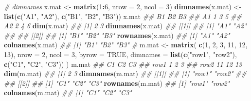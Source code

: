 \documentclass[
]{book}
\newenvironment{Shaded}{\begin{snugshade}}{\end{snugshade}}
\newcommand{\CommentTok}[1]{\textcolor[rgb]{0.56,0.35,0.01}{\textit{#1}}}
\newcommand{\DataTypeTok}[1]{\textcolor[rgb]{0.13,0.29,0.53}{#1}}
\newcommand{\DecValTok}[1]{\textcolor[rgb]{0.00,0.00,0.81}{#1}}
\newcommand{\KeywordTok}[1]{\textcolor[rgb]{0.13,0.29,0.53}{\textbf{#1}}}
\newcommand{\NormalTok}[1]{#1}
\newcommand{\OperatorTok}[1]{\textcolor[rgb]{0.81,0.36,0.00}{\textbf{#1}}}
\newcommand{\OtherTok}[1]{\textcolor[rgb]{0.56,0.35,0.01}{#1}}
\newcommand{\StringTok}[1]{\textcolor[rgb]{0.31,0.60,0.02}{#1}}
\begin{document}
\begin{Shaded}
\begin{Highlighting}[]
\CommentTok{\# dimnames}
\NormalTok{x.mat  \textless{}{-}}\StringTok{  }\KeywordTok{matrix}\NormalTok{(}\DecValTok{1}\OperatorTok{:}\DecValTok{6}\NormalTok{, }\DataTypeTok{nrow =} \DecValTok{2}\NormalTok{, }\DataTypeTok{ncol =} \DecValTok{3}\NormalTok{)}
\KeywordTok{dimnames}\NormalTok{(x.mat) \textless{}{-}}\StringTok{ }\KeywordTok{list}\NormalTok{(}\KeywordTok{c}\NormalTok{(}\StringTok{"A1"}\NormalTok{, }\StringTok{"A2"}\NormalTok{),}
                        \KeywordTok{c}\NormalTok{(}\StringTok{"B1"}\NormalTok{, }\StringTok{"B2"}\NormalTok{, }\StringTok{"B3"}\NormalTok{))}
\NormalTok{x.mat}
\CommentTok{\#\#    B1 B2 B3}
\CommentTok{\#\# A1  1  3  5}
\CommentTok{\#\# A2  2  4  6}
\KeywordTok{dim}\NormalTok{(x.mat)}
\CommentTok{\#\# [1] 2 3}
\KeywordTok{dimnames}\NormalTok{(x.mat)}
\CommentTok{\#\# [[1]]}
\CommentTok{\#\# [1] "A1" "A2"}
\CommentTok{\#\# }
\CommentTok{\#\# [[2]]}
\CommentTok{\#\# [1] "B1" "B2" "B3"}
\KeywordTok{rownames}\NormalTok{(x.mat)}
\CommentTok{\#\# [1] "A1" "A2"}
\KeywordTok{colnames}\NormalTok{(x.mat)}
\CommentTok{\#\# [1] "B1" "B2" "B3"}
\CommentTok{\#}
\NormalTok{m.mat \textless{}{-}}\StringTok{ }\KeywordTok{matrix}\NormalTok{(}
  \KeywordTok{c}\NormalTok{(}\DecValTok{1}\NormalTok{, }\DecValTok{2}\NormalTok{, }\DecValTok{3}\NormalTok{, }\DecValTok{11}\NormalTok{, }\DecValTok{12}\NormalTok{, }\DecValTok{13}\NormalTok{),}
  \DataTypeTok{nrow =} \DecValTok{2}\NormalTok{,}
  \DataTypeTok{ncol =} \DecValTok{3}\NormalTok{,}
  \DataTypeTok{byrow =} \OtherTok{TRUE}\NormalTok{,}
  \DataTypeTok{dimnames =} \KeywordTok{list}\NormalTok{(}\KeywordTok{c}\NormalTok{(}\StringTok{"row1"}\NormalTok{, }\StringTok{"row2"}\NormalTok{),}
                  \KeywordTok{c}\NormalTok{(}\StringTok{"C1"}\NormalTok{, }\StringTok{"C2"}\NormalTok{, }\StringTok{"C3"}\NormalTok{))}
\NormalTok{)}
\NormalTok{m.mat}
\CommentTok{\#\#      C1 C2 C3}
\CommentTok{\#\# row1  1  2  3}
\CommentTok{\#\# row2 11 12 13}
\KeywordTok{dim}\NormalTok{(m.mat)}
\CommentTok{\#\# [1] 2 3}
\KeywordTok{dimnames}\NormalTok{(m.mat)}
\CommentTok{\#\# [[1]]}
\CommentTok{\#\# [1] "row1" "row2"}
\CommentTok{\#\# }
\CommentTok{\#\# [[2]]}
\CommentTok{\#\# [1] "C1" "C2" "C3"}
\KeywordTok{rownames}\NormalTok{(m.mat)}
\CommentTok{\#\# [1] "row1" "row2"}
\KeywordTok{colnames}\NormalTok{(m.mat)}
\CommentTok{\#\# [1] "C1" "C2" "C3"}
\end{Highlighting}
\end{Shaded}
\end{document}
